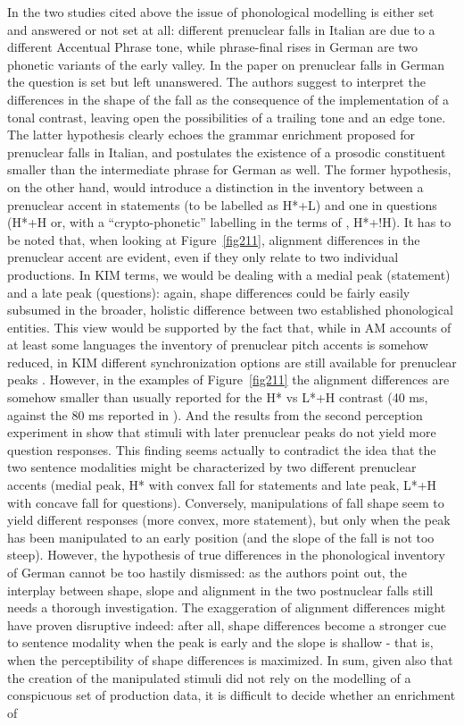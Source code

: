In the two studies cited above the issue of phonological modelling is either set and answered or not set at all: different prenuclear falls in Italian are due to a different Accentual Phrase tone, while phrase-final rises in German are two phonetic variants of the early valley. In the paper on prenuclear falls in German \citep{petrone2014intonation} the question is set but left unanswered. The authors suggest to interpret the differences in the shape of the fall as the consequence of the implementation of a tonal contrast, leaving open the possibilities of a trailing tone and an edge tone. The latter hypothesis clearly echoes the grammar enrichment proposed for prenuclear falls in Italian, and postulates the existence of a prosodic constituent smaller than the intermediate phrase for German as well. The former hypothesis, on the other hand, would introduce a distinction in the inventory between a prenuclear accent in statements (to be labelled as H*+L) and one in questions (H*+H or, with a ``crypto-phonetic'' labelling in the terms of \citealt{atterer2004phonetics}, H*+!H). It has to be noted that, when looking at Figure~\ref{fig211}, alignment differences in the prenuclear accent are evident, even if they only relate to two individual productions. In KIM terms, we would be dealing with a medial peak (statement) and a late peak (questions): again, shape differences could be fairly easily subsumed in the broader, holistic difference between two established phonological entities. This view would be supported by the fact that, while in AM accounts of at least some languages the inventory of prenuclear pitch accents is somehow reduced, in KIM different synchronization options are still available for prenuclear peaks \citep{niebuhr2006alignment}. However, in the examples of Figure~\ref{fig211} the alignment differences are somehow smaller than usually reported for the H* vs L*+H contrast (40 ms, against the 80 ms reported in \citealt{niebuhr2006alignment}). And the results from the second perception experiment in \citet{petrone2014intonation} show that stimuli with later prenuclear peaks do not yield more question responses. This finding seems actually to contradict the idea that the two sentence modalities might be characterized by two different prenuclear accents (medial peak, H* with convex fall for statements and late peak, L*+H with concave fall for questions). Conversely, manipulations of fall shape seem to yield different responses (more convex, more statement), but only when the peak has been manipulated to an early position (and the slope of the fall is not too steep). However, the hypothesis of true differences in the phonological inventory of German cannot be too hastily dismissed: as the authors point out, the interplay between shape, slope and alignment in the two postnuclear falls still needs a thorough investigation. The exaggeration of alignment differences might have proven disruptive indeed: after all, shape differences become a stronger cue to sentence modality when the peak is early and the slope is shallow - that is, when the perceptibility of shape differences is maximized. In sum, given also that the creation of the manipulated stimuli did not rely on the modelling of a conspicuous set of production data, it is difficult to decide whether an enrichment of 